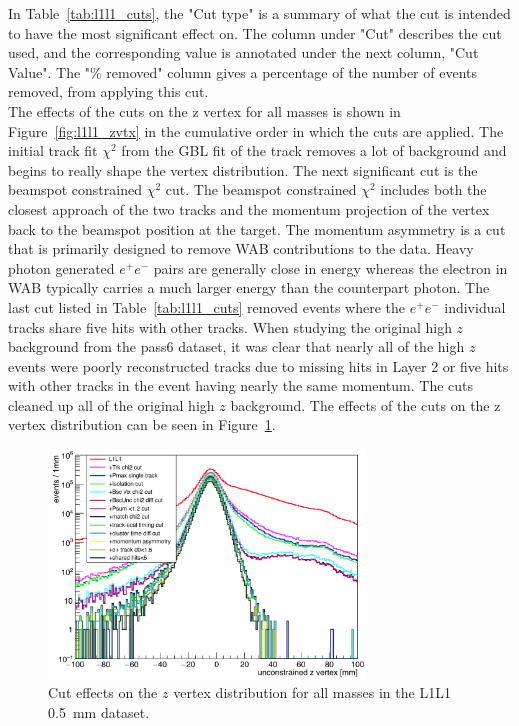 In Table~\ref{tab:l1l1_cuts}, the "Cut type" is a summary of what the cut is intended to have the most significant effect on. The column under "Cut" describes the cut used, and the corresponding value is annotated under the next column, "Cut Value". The "$\%$ removed" column gives a percentage of the number of events removed, from applying this cut. \\
\indent The effects of the cuts on the z vertex for all masses is shown in Figure~\ref{fig:l1l1_zvtx} in the cumulative order in which the cuts are applied. The initial track fit $\chi^{2}$ from the GBL fit of the track removes a lot of background and begins to really shape the vertex distribution. The next significant cut is the beamspot constrained $\chi^{2}$ cut. The beamspot constrained $\chi^{2}$ includes both the closest approach of the two tracks and the momentum projection of the vertex back to the beamspot position at the target. The momentum asymmetry is a cut that is primarily designed to remove WAB contributions to the data. Heavy photon generated $e^+e^-$ pairs are generally close in energy whereas the electron in WAB typically carries a much larger energy than the counterpart photon. 
\indent The last cut listed in Table~\ref{tab:l1l1_cuts} removed events where the $e^+e^-$ individual tracks share five hits with other tracks. When studying the original high $z$ background from the pass6 dataset, it was clear that nearly all of the high $z$ events were poorly reconstructed tracks due to missing hits in Layer 2 or five hits with other tracks in the event having nearly the same momentum. The cuts cleaned up all of the original high $z$ background. The effects of the cuts on the z vertex distribution can be seen in Figure~\ref{fig:l1l1_vtx}.

\begin{figure}[htb]
  \centering
      \includegraphics[width=0.75\textwidth]{pics/searching/L1L1_zvtx.png}
  \caption[Cut effects on the $z$ vertex distribution]{Cut effects on the $z$ vertex distribution for all masses in the L1L1 0.5~mm dataset.}
  \label{fig:l1l1_vtx}
\end{figure} 

